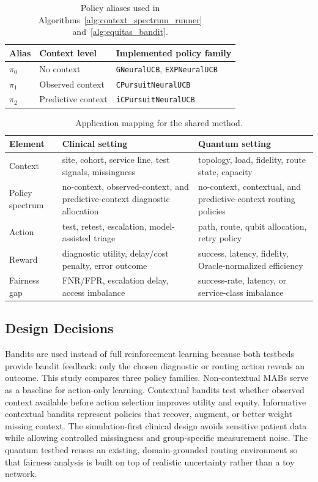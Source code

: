 \documentclass[conference]{IEEEtran}
\begin{document}
\begin{table}[t]
\caption{Policy aliases used in Algorithms~\ref{alg:context_spectrum_runner} and~\ref{alg:equitas_bandit}.}
\label{tab:policy_aliases}
\centering
\small
\begin{tabular}{p{}p{}p{}}
\toprule
\textbf{Alias} & \textbf{Context level} & \textbf{Implemented policy family} \\
\midrule
$\pi_0$ & No context & \texttt{GNeuralUCB}, \texttt{EXPNeuralUCB} \\
$\pi_1$ & Observed context & \texttt{CPursuitNeuralUCB} \\
$\pi_2$ & Predictive context & \texttt{iCPursuitNeuralUCB} \\
\bottomrule
\end{tabular}
\end{table}

\begin{table}[t]
\caption{Application mapping for the shared method.}
\label{tab:application_mapping}
\centering
\small
\begin{tabular}{p{}p{}p{}}
\toprule
\textbf{Element} & \textbf{Clinical setting} & \textbf{Quantum setting} \\
\midrule
Context & site, cohort, service line, test signals, missingness & topology, load, fidelity, route state, capacity \\
Policy spectrum & no-context, observed-context, and predictive-context diagnostic allocation & no-context, contextual, and predictive-context routing policies \\
Action & test, retest, escalation, model-assisted triage & path, route, qubit allocation, retry policy \\
Reward & diagnostic utility, delay/cost penalty, error outcome & success, latency, fidelity, Oracle-normalized efficiency \\
Fairness gap & FNR/FPR, escalation delay, access imbalance & success-rate, latency, or service-class imbalance \\
\bottomrule
\end{tabular}
\end{table}

\subsection{Design Decisions}
Bandits are used instead of full reinforcement learning because both testbeds
provide bandit feedback: only the chosen diagnostic or routing action reveals
an outcome. This study compares three policy families. Non-contextual MABs
serve as a baseline for action-only learning. Contextual bandits test whether
observed context available before action selection improves utility and equity.
Informative contextual bandits represent policies that recover, augment, or
better weight missing context. The simulation-first clinical design avoids
sensitive patient data while allowing controlled missingness and group-specific
measurement noise. The quantum testbed reuses an existing, domain-grounded
routing environment so that fairness analysis is built on top of realistic
uncertainty rather than a toy network.
\end{document}
